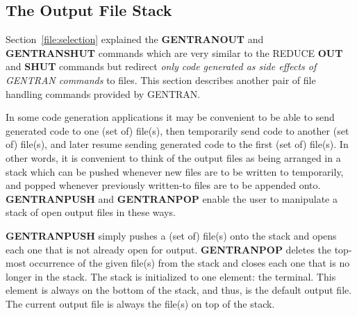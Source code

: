 \subsection{The Output File Stack}
Section~\ref{file:selection}
explained the {\bf GENTRANOUT} and {\bf GENTRANSHUT}
commands which are very similar to the REDUCE {\bf OUT} and {\bf SHUT}
commands but redirect {\it only code generated as side effects of GENTRAN
commands\/} to files.  This section describes another pair of file
handling commands provided by GENTRAN.

In some code generation applications it may be convenient to be
able to send generated code to one (set of) file(s), then
temporarily send code to another (set of) file(s), and later
resume sending generated code to the first (set of) file(s).  In
other words, it is convenient to think of the output files as
being arranged in a stack which can be pushed whenever new
files are to be written to temporarily, and popped whenever
previously written-to files are to be appended onto.  {\bf GENTRANPUSH}
 
and {\bf GENTRANPOP} enable the user to manipulate a stack of open
output files in these ways.

{\bf GENTRANPUSH} simply pushes a (set of) file(s) onto
the stack and opens each one that is not already open for
output.  {\bf GENTRANPOP} deletes the top-most occurrence of
the given file(s) from the stack and closes each one that is no
longer in the stack.  The stack is initialized to one element:  the
terminal.  This element is always on the bottom of the stack, and thus,
is the default output file.  The current output file is always the
file(s) on top of the stack.

